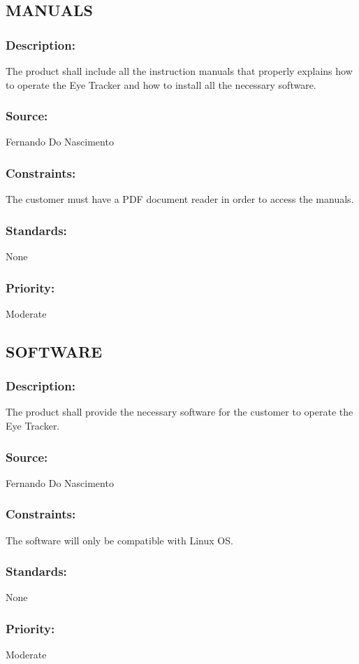 \subsection{\text MANUALS}
\subsubsection{Description:}
	{The product shall include all the instruction manuals that properly explains how to operate the Eye Tracker and how to install all the necessary software.}
\subsubsection{Source:} 
	{Fernando Do Nascimento}
\subsubsection{Constraints:} 
	{The customer must have a PDF document reader in order to access the manuals.}
\subsubsection{Standards:} 
	{None}
\subsubsection{Priority:} 
	{Moderate}
\newline
	
\subsection{\text SOFTWARE}
\subsubsection{Description:} 
	{The product shall provide the necessary software for the customer to operate the Eye Tracker.}
\subsubsection{Source:} 
	{Fernando Do Nascimento}
\subsubsection{Constraints:} 
	{The software will only be compatible with Linux OS.}
\subsubsection{Standards:} 
	{None}
\subsubsection{Priority:} 
	{Moderate}
